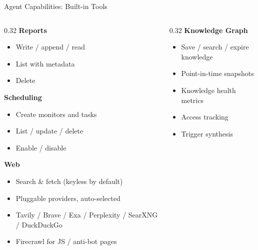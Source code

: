 \documentclass[aspectratio=169,10pt]{beamer}
\begin{document}
\begin{frame}{Agent Capabilities: Built-in Tools}
\begin{columns}[T]
\begin{column}{0.32\textwidth}
\textbf{\color{rhred}Reports}
\begin{itemize}\scriptsize\setlength{\itemsep}{0pt}
  \item Write / append / read
  \item List with metadata
  \item Delete
\end{itemize}

\smallskip
\textbf{\color{rhblue}Scheduling}
\begin{itemize}\scriptsize\setlength{\itemsep}{0pt}
  \item Create monitors and tasks
  \item List / update / delete
  \item Enable / disable
\end{itemize}

\smallskip
\textbf{\color{rhblue}Web}
\begin{itemize}\scriptsize\setlength{\itemsep}{0pt}
  \item Search \& fetch (keyless by default)
  \item Pluggable providers, auto-selected
  \item Tavily / Brave / Exa / Perplexity / SearXNG / DuckDuckGo
  \item Firecrawl for JS / anti-bot pages
\end{itemize}
\end{column}
\begin{column}{0.32\textwidth}
\textbf{\color{rhgreen}Knowledge Graph}
\begin{itemize}\scriptsize\setlength{\itemsep}{0pt}
  \item Save / search / expire knowledge
  \item Point-in-time snapshots
  \item Knowledge health metrics
  \item Access tracking
  \item Trigger synthesis
\end{itemize}


\end{column}
\end{columns}
\end{frame}
\end{document}
